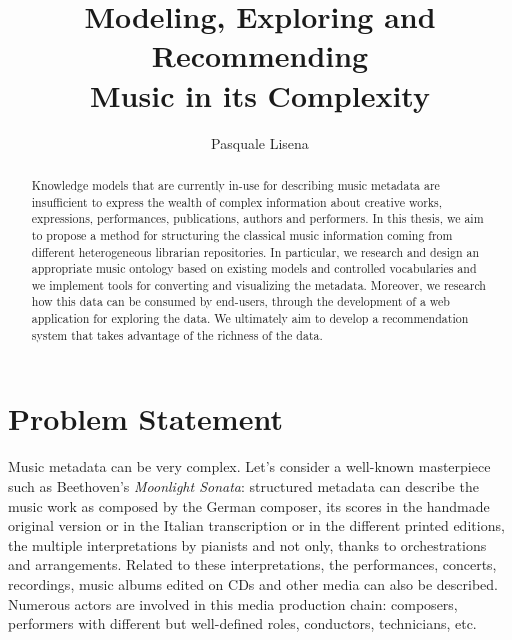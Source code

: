 \documentclass{llncs}
\begin{document}
\title{Modeling, Exploring and Recommending\\ Music in its Complexity}

\author{Pasquale Lisena}

\maketitle


\begin{abstract}
Knowledge models that are currently in-use for describing music metadata are insufficient to express the wealth of complex information about creative works, expressions, performances, publications, authors and performers. In this thesis, we aim to propose a method for structuring the classical music information coming from different heterogeneous librarian repositories. In particular, we research and design an appropriate music ontology based on existing models and controlled vocabularies and we implement tools for converting and visualizing the metadata. Moreover, we research how this data can be consumed by end-users, through the development of a web application for exploring the data. We ultimately aim to develop a recommendation system that takes advantage of the richness of the data.

\end{abstract}


\section{Problem Statement}
\label{sec:problem}
Music metadata can be very complex. Let's consider a well-known masterpiece such as Beethoven's \textit{Moonlight Sonata}: structured metadata can describe the music work as composed by the German composer, its scores in the handmade original version or in the Italian transcription or in the different printed editions, the multiple interpretations by pianists and not only, thanks to orchestrations and arrangements. Related to these interpretations, the performances, concerts, recordings, music albums edited on CDs and other media can also be described. Numerous actors are involved in this media production chain: composers, performers with different but well-defined roles, conductors, technicians, etc.
\end{document}
